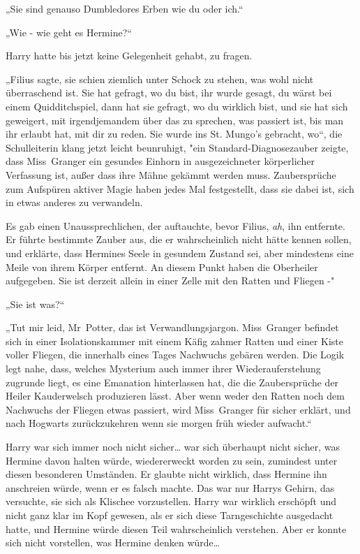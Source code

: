 {„Sie sind genauso Dumbledores Erben wie du oder ich.“

„Wie - wie geht es Hermine?“

Harry hatte bis jetzt keine Gelegenheit gehabt, zu fragen.

„Filius sagte, sie schien ziemlich unter Schock zu stehen, was wohl nicht überraschend ist. Sie hat gefragt, wo du bist, ihr wurde gesagt, du wärst bei einem Quidditchspiel, dann hat sie gefragt, wo du wirklich bist, und sie hat sich geweigert, mit irgendjemandem über das zu sprechen, was passiert ist, bis man ihr erlaubt hat, mit dir zu reden. Sie wurde ins St. Mungo's gebracht, wo“, die Schulleiterin klang jetzt leicht beunruhigt, "ein Standard-Diagnosezauber zeigte, dass Miss~Granger ein gesundes Einhorn in ausgezeichneter körperlicher Verfassung ist, außer dass ihre Mähne gekämmt werden muss. Zaubersprüche zum Aufspüren aktiver Magie haben jedes Mal festgestellt, dass sie dabei ist, sich in etwas anderes zu verwandeln.

Es gab einen Unaussprechlichen, der auftauchte, bevor Filius, \emph{ah}, ihn entfernte. Er führte bestimmte Zauber aus, die er wahrscheinlich nicht hätte kennen sollen, und erklärte, dass Hermines Seele in gesundem Zustand sei, aber mindestens eine Meile von ihrem Körper entfernt. An diesem Punkt haben die Oberheiler aufgegeben. Sie ist derzeit allein in einer Zelle mit den Ratten und Fliegen -"

„Sie ist was?“

„Tut mir leid, Mr~Potter, das ist Verwandlungsjargon. Miss~Granger befindet sich in einer Isolationskammer mit einem Käfig zahmer Ratten und einer Kiste voller Fliegen, die innerhalb eines Tages Nachwuchs gebären werden. Die Logik legt nahe, dass, welches Mysterium auch immer ihrer Wiederauferstehung zugrunde liegt, es eine Emanation hinterlassen hat, die die Zaubersprüche der Heiler Kauderwelsch produzieren lässt. Aber wenn weder den Ratten noch dem Nachwuchs der Fliegen etwas passiert, wird Miss~Granger für sicher erklärt, und nach Hogwarts zurückzukehren wenn sie morgen früh wieder aufwacht.“

Harry war sich immer noch nicht sicher… war sich überhaupt nicht sicher, was Hermine davon halten würde, wiedererweckt worden zu sein, zumindest unter diesen besonderen Umständen. Er glaubte nicht wirklich, dass Hermine ihn anschreien würde, wenn er es falsch machte. Das war nur Harrys Gehirn, das versuchte, sie sich als Klischee vorzustellen. Harry war wirklich erschöpft und nicht ganz klar im Kopf gewesen, als er sich diese Tarngeschichte ausgedacht hatte, und Hermine würde diesen Teil wahrscheinlich verstehen. Aber er konnte sich nicht vorstellen, was Hermine denken würde…

}
